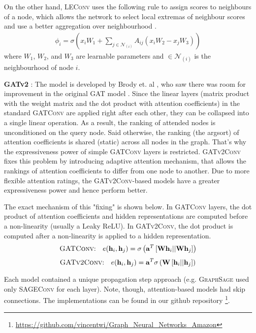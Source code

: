 \documentclass[sigconf, nonacm]{acmart}
\begin{document}
On the other hand, \textsc{LEConv} uses the following rule to assign scores to neighbours of a node, which allows the network to select local extremas of neighbour scores and use a better aggregation over neighbourhood \cite{LeConvPaper}.
\begin{align} 
\phi_i = \sigma \left(x_i W_1 + \sum_{j \in \mathcal{N}_{(i)}} A_{ij} \left(x_i W_2 - x_j W_3\right) \right)
\end{align} 
where $W_1$, $W_2$, and $W_3$ are learnable parameters and $\in \mathcal{N}_{(i)}$ is the neighbourhood of node $i$.

\textbf{GATv2} : The model is developed by Brody et. al \cite{Brodyetal}, who saw there was room for improvement in the original \textsc{GAT} model \cite{Velickovic2017}. Since the linear layers (matrix product with the weight matrix and the dot product with attention coefficients) in the standard \textsc{GATConv} are applied right after each other, they can be collapsed into a single linear operation. As a result, the ranking of attended nodes is unconditioned on the query node. Said otherwise, the ranking (the argsort) of attention coefficients is shared (static) across all nodes in the graph. That's why the expressiveness power of simple \textsc{GATConv} layers is restricted. \textsc{GATv2Conv} fixes this problem by introducing adaptive attention mechanism, that allows the rankings of attention coefficients to differ from one node to another. Due to more flexible attention ratings, the \textsc{GATv2Conv}-based models have a greater expressiveness power and hence perform better.

The exact mechanism of this "fixing" is shown below. In \textsc{GATConv} layers, the dot product of attention coefficients and hidden representations are computed before a non-linearity (usually a Leaky ReLU). In \textsc{GATv2Conv}, the dot product is computed after a non-linearity is applied to a hidden representation.
\begin{align} \text{\textsc{GATConv}:} \quad e(\mathbf h_i, \mathbf h_j) = \sigma\left( \mathbf{a}^T \left[\mathbf W \mathbf h_i || \mathbf W \mathbf h_j \right] \right)
\end{align}
\begin{align} 
\text{\textsc{GATv2Conv}:} \quad e(\mathbf h_i, \mathbf h_j) = \mathbf{a}^T\sigma\left( \mathbf W\left[\mathbf h_i || \mathbf h_j \right] \right)
\end{align}

Each model contained a unique propagation step approach (e.g. \textsc{GraphSage} used only \textsc{SAGEConv} for each layer). Note, though, attention-based models had skip connections. The implementations can be found in our github repository \footnote{ \href{https://github.com/vincentwi/Graph_Neural_Networks_Amazon}{https://github.com/vincentwi/Graph\_Neural\_Networks\_Amazon}}. 
\end{document}
